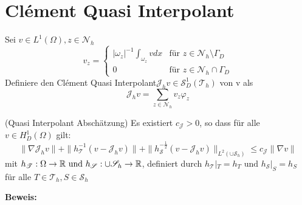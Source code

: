 \section{Clément Quasi Interpolant}
\begin{definition}
    Sei $v \in L^1(\Omega) , z \in \mathscr{N}_h$
	\[
	v_z =  \left\{
	\begin{array}{ll}
		|\omega_z|^{-1} \int_{\omega_z} v dx& \text{f\"ur } z \in \mathscr{N}_h \setminus \Gamma_D\\
		0 &  \text{f\"ur } z \in \mathscr{N}_h \cap \Gamma_D
	\end{array}\right.
	\]
	Definiere den Clément Quasi Interpolant$\mathscr{J}_hv \in \mathscr{S}_D^1(\mathscr{T}_h)$ von v als
	\begin{displaymath}
		\mathscr{J}_hv = \sum_{z\in \mathscr{N}_h} v_z \varphi_z
	\end{displaymath}
\end{definition}
\begin{theorem}(Quasi Interpolant Abschätzung)
	Es existiert $c_\mathscr{J} > 0$, so dass f\"ur alle $v\in H^1_D(\Omega)$ gilt:
	\[
	\|\nabla\mathscr{J}_hv\| +\|h^{-1}_\mathscr{T}(v-\mathscr{J}_hv)\| +\|h^{-\frac{1}{2}}_\mathscr{S}(v-\mathscr{J}_hv)\|_{L^2(\cup\mathscr{S}_h)} \leq c_\mathscr{J}\|\nabla v\|
	\]
	mit $h_\mathscr{T}: \Omega \rightarrow  \mathbb{R} \text{ und } h_\mathscr{S}: \cup \mathscr{S}_h \rightarrow  \mathbb{R}$, definiert durch $h_\mathscr{T}|_T = h_T \text{ und }  h_\mathscr{S}|_S = h_S$ \\ f\"ur alle $T\in\mathscr{T}_h, S\in\mathscr{S}_h$ 
\end{theorem}
\textbf{Beweis:}
